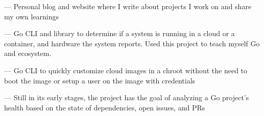 

\begin{cventries}
\vspace{-4mm}

  \cventry
    {}
    {}
    {}
    {}
    {
      \begin{cvitems}
        \item {
           — Personal blog and
          website where I write about projects I work on and share my own
          learnings
        }
        \item {
           —
          Go CLI and library to determine if a system is running in a
          cloud or a container, and hardware the system reports. Used this
          project to teach myself Go and ecosystem.
        }
        \item {
           —
          Go CLI to quickly customize cloud images in a chroot without the
          need to boot the image or setup a user on the image with credentials
        }
        \item {
           —
          Still in its early stages, the project has the goal of analyzing a
          Go project's health based on the state of dependencies, open issues,
          and PRs
        }
      \end{cvitems}
    }
    {}

\end{cventries}
